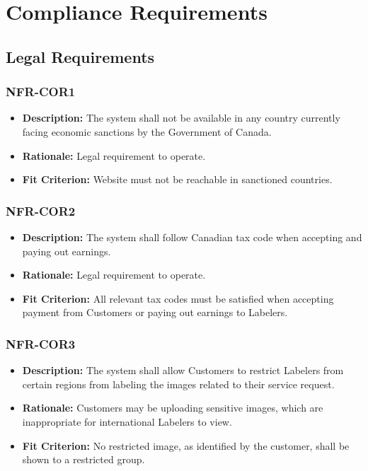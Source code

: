 \documentclass[12pt]{article}
\begin{document}
\section{Compliance Requirements}
\subsection{Legal Requirements}
\subsubsection*{NFR-COR1}
\begin{itemize}
  \item \textbf{Description:} The system shall not be available in any country currently facing economic sanctions by the Government of Canada.
  \item \textbf{Rationale:} Legal requirement to operate.
  \item \textbf{Fit Criterion:} Website must not be reachable in sanctioned countries.
\end{itemize}
\subsubsection*{NFR-COR2}
\begin{itemize}
  \item \textbf{Description:} The system shall follow Canadian tax code when accepting and paying out earnings.
  \item \textbf{Rationale:} Legal requirement to operate.
  \item \textbf{Fit Criterion:} All relevant tax codes must be satisfied when accepting payment from Customers or paying out earnings to Labelers.
\end{itemize}
\subsubsection*{NFR-COR3}
\begin{itemize}
  \item \textbf{Description:} The system shall allow Customers to restrict Labelers from certain regions from labeling the images related to their service request.
  \item \textbf{Rationale:} Customers may be uploading sensitive images, which are inappropriate for international Labelers to view.
  \item \textbf{Fit Criterion:} No restricted image, as identified by the customer, shall be shown to a restricted group.
\end{itemize}
\end{document}
